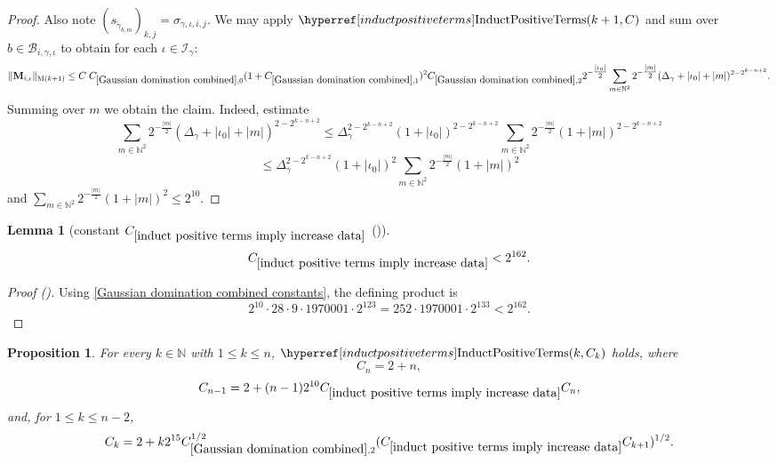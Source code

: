 \documentclass[12pt,reqno]{amsart}
\newcommand{\auto}{{({\tiny\faCar})}}
\theoremstyle{plain}
\newtheorem{lemma}[theorem]{Lemma}
\newtheorem{proposition}[theorem]{Proposition}
\numberwithin{equation}{section}
\theoremstyle{remark}
\newcommand{\using}[1]{}
\newcommand{\N}{{\mathbb N}}
\newcommand{\M}{\mathbf{M}}
\begin{document}
\begin{proof}
Also note $(s_{\widetilde{\gamma}_{b,m}})_{k,j}=\sigma_{\gamma,\iota,i,j}$.
We may apply $\InductPositiveTerms{k+1,C}$ and sum over $b\in \mathcal{B}_{i,\gamma,\iota}$ to obtain for each $\iota\in\mathcal{I}_{\gamma}$:
\[ \|\M_{i,\iota}\|_{{\rm M}(k+1)} \le C\; C_{\ref{Gaussian domination combined},0} (1+C_{\ref{Gaussian domination combined},1})^2 C_{\ref{Gaussian domination combined},2} 2^{-\tfrac{|\iota_0|}{2}} \sum_{m\in\mathbb{N}^2} 2^{-\tfrac{|m|}{2}} (\Delta_\gamma + |\iota_0|+|m|)^{2-2^{k-n+2}}. \]
Summing over $m$ we obtain the claim.
Indeed, estimate
\[ \sum_{m\in\mathbb{N}^2} 2^{-\tfrac{|m|}{2}} (\Delta_\gamma + |\iota_0|+|m|)^{2-2^{k-n+2}} \le \Delta_\gamma^{2-2^{k-n+2}} (1+|\iota_0|)^{2-2^{k-n+2}} \sum_{m\in\N^2} 2^{-\tfrac{|m|}{2}} (1+|m|)^{2-2^{k-n+2}} \]
\[
\leq \Delta_\gamma^{2-2^{k-n+2}} (1+|\iota_0|)^{2} \sum_{m\in\N^2} 2^{-\tfrac{|m|}{2}} (1+|m|)^{2}
\]
and $\sum_{m\in\N^2} 2^{-\frac{|m|}{2}} (1+|m|)^2\le 2^{10}$.
\end{proof}

\begin{lemma}[constant $C_{\ref{induct positive terms imply increase data}}$ \auto]\label{constant induct positive terms imply increase data}\using{Gaussian domination combined}
\begin{equation}\label{constant induct positive terms imply increase data bound}
C_{\ref{induct positive terms imply increase data}}<2^{162}.
\end{equation}
\end{lemma}
\begin{proof}[Proof \auto]
Using \eqref{Gaussian domination combined constants}, the defining product is
\[
2^{10}\cdot28\cdot9\cdot1970001\cdot2^{123}
=252\cdot1970001\cdot2^{133}
<2^{162}.
\]
\end{proof}


\begin{proposition}\label{P:C_k-induction}\using{vanishing diagonal implies induct positive terms}\using{vanishing kernel integral}\using{induct positive terms imply increase data}\using{increase data implies diagonal band}\using{diagonal band implies vanishing diagonal}
For every $k\in\N$ with $1\le k\le n$, $\InductPositiveTerms{k,C_k}$ holds, where
\begin{equation}\label{auto:positive-induction-recursion}
C_n=2+n,
\end{equation}
\begin{equation}\label{auto:positive-induction-recursion-terminal-step}
C_{n-1}=2+(n-1)2^{10}C_{\ref{induct positive terms imply increase data}}C_n,
\end{equation}
and, for $1\le k\le n-2$,
\begin{equation}\label{auto:positive-induction-recursion-interior-step}
C_k=2+k2^{15}C_{\ref{Gaussian domination combined},2}^{1/2}
(C_{\ref{induct positive terms imply increase data}}C_{k+1})^{1/2}.
\end{equation}
\end{proposition}
\end{document}
